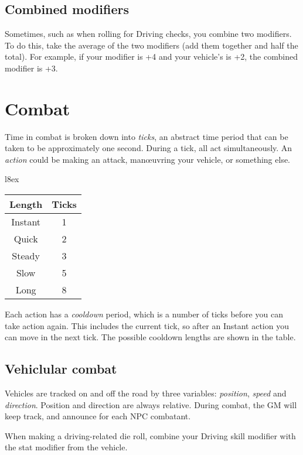 \documentclass[10pt, a4paper, twocolumn]{article}
\begin{document}
\subsection{Combined modifiers}
Sometimes, such as when rolling for Driving checks, you combine two
modifiers. To do this, take the average of the two modifiers (add them
together and half the total). For example, if your 
modifier is +4 and your vehicle's  is +2, the combined modifier
is +3.

\section{Combat}
Time in combat is broken down into \emph{ticks}, an abstract time period that
can be taken to be approximately one second. During a tick, all act
simultaneously. An \emph{action} could be making an attack, man\oe{}uvring your
vehicle, or something else. 

\begin{wraptable}[5]{l}{8ex}
  \small
\vspace*{-4ex}
\hspace*{-4ex}
\begin{tabular}{cc}
  Length   & Ticks \\
  \hline 
  Instant  & 1     \\
  Quick    & 2     \\
  Steady   & 3     \\
  Slow     & 5     \\
  Long     & 8
\end{tabular}
\end{wraptable}

Each action has a \emph{cooldown} period, which is a number of ticks before you
can take action again. This includes the current tick, so after an Instant
action you can move in the next tick. The possible cooldown lengths are shown in
the table. 

\subsection{Vehiclular combat}
Vehicles are tracked on and off the road by three variables: \emph{position},
\emph{speed} and \emph{direction}. Position and direction are always relative.
During combat, the GM will keep track, and announce for each NPC combatant.

When making a driving-related die roll, combine your Driving skill modifier with
the stat modifier from the vehicle.
\end{document}
